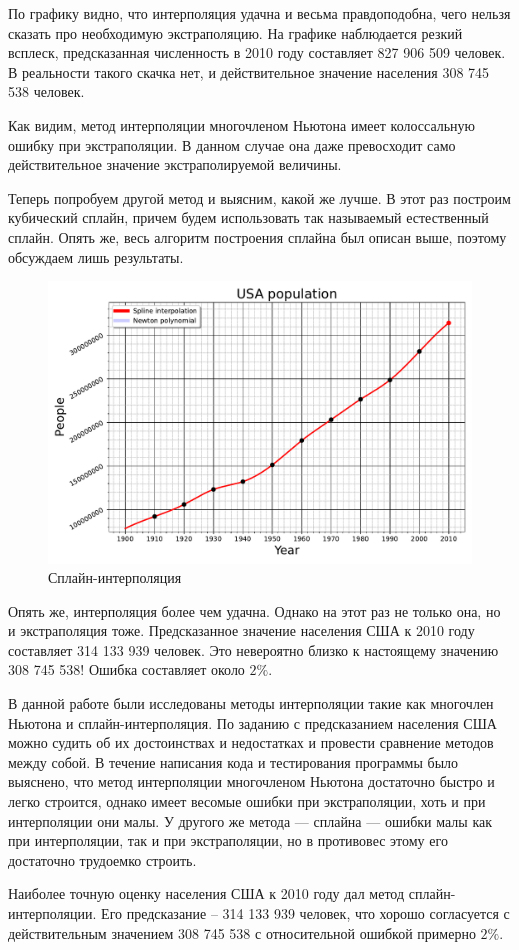 		По графику видно, что интерполяция удачна и весьма правдоподобна, чего нельзя сказать про необходимую экстраполяцию. На графике наблюдается резкий всплеск, предсказанная численность в 2010 году составляет 827 906 509 человек. В реальности такого скачка нет, и действительное значение населения 308 745 538 человек.
		
		Как видим, метод интерполяции многочленом Ньютона имеет колоссальную ошибку при экстраполяции. В данном случае она даже превосходит само действительное значение экстраполируемой величины.
	
		
		\newpage
		Теперь попробуем другой метод и выясним, какой же лучше. В этот раз построим кубический сплайн, причем будем использовать так называемый естественный сплайн. Опять же, весь алгоритм построения сплайна был описан выше, поэтому обсуждаем лишь результаты.
		\begin{figure}[h!]
			\centering
			\includegraphics[width=\linewidth]{Pictures/Spline.pdf}
			\caption{Сплайн-интерполяция}
		\end{figure}
	
		Опять же, интерполяция более чем удачна. Однако на этот раз не только она, но и экстраполяция тоже. Предсказанное значение населения США к 2010 году составляет 314 133 939 человек. Это невероятно близко к настоящему значению 308 745 538! Ошибка составляет около $2\%$.
		
		\newpage
		
		В данной работе были исследованы методы интерполяции такие как многочлен Ньютона и сплайн-интерполяция. По заданию с предсказанием населения США можно судить об их достоинствах и недостатках и провести сравнение методов между собой. В течение написания кода и тестирования программы было выяснено, что метод интерполяции многочленом Ньютона достаточно быстро и легко строится, однако имеет весомые ошибки при экстраполяции, хоть и при интерполяции они малы. У другого же метода --- сплайна --- ошибки малы как при интерполяции, так и при экстраполяции, но в противовес этому его достаточно трудоемко строить.
		
		Наиболее точную оценку населения США к 2010 году дал метод сплайн-интерполяции. Его предсказание -- 314 133 939 человек, что хорошо согласуется с действительным значением 308 745 538 с относительной ошибкой примерно $2\%$.
		
